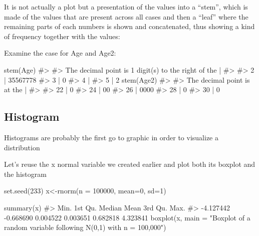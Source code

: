 \documentclass[
  letterpaper,
  DIV=11,
  numbers=noendperiod]{scrreprt}
\newenvironment{Shaded}{\begin{snugshade}}{\end{snugshade}}
\newcommand{\AttributeTok}[1]{\textcolor[rgb]{0.40,0.45,0.13}{#1}}
\newcommand{\CommentTok}[1]{\textcolor[rgb]{0.37,0.37,0.37}{#1}}
\newcommand{\DecValTok}[1]{\textcolor[rgb]{0.68,0.00,0.00}{#1}}
\newcommand{\FunctionTok}[1]{\textcolor[rgb]{0.28,0.35,0.67}{#1}}
\newcommand{\NormalTok}[1]{\textcolor[rgb]{0.00,0.23,0.31}{#1}}
\newcommand{\OtherTok}[1]{\textcolor[rgb]{0.00,0.23,0.31}{#1}}
\newcommand{\StringTok}[1]{\textcolor[rgb]{0.13,0.47,0.30}{#1}}
\begin{document}
It is not actually a plot but a presentation of the values into a
``stem'', which is made of the values that are present across all cases
and then a ``leaf'' where the remaining parts of each numbers is shown
and concatenated, thus showing a kind of frequency together with the
values:

Examine the case for Age and Age2:

\begin{Shaded}
\begin{Highlighting}[]
\FunctionTok{stem}\NormalTok{(Age)}
\CommentTok{\#\textgreater{} }
\CommentTok{\#\textgreater{}   The decimal point is 1 digit(s) to the right of the |}
\CommentTok{\#\textgreater{} }
\CommentTok{\#\textgreater{}   2 | 35567778}
\CommentTok{\#\textgreater{}   3 | 0}
\CommentTok{\#\textgreater{}   4 | }
\CommentTok{\#\textgreater{}   5 | 2}
\FunctionTok{stem}\NormalTok{(Age2)}
\CommentTok{\#\textgreater{} }
\CommentTok{\#\textgreater{}   The decimal point is at the |}
\CommentTok{\#\textgreater{} }
\CommentTok{\#\textgreater{}   22 | 0}
\CommentTok{\#\textgreater{}   24 | 00}
\CommentTok{\#\textgreater{}   26 | 0000}
\CommentTok{\#\textgreater{}   28 | 0}
\CommentTok{\#\textgreater{}   30 | 0}
\end{Highlighting}
\end{Shaded}

\subsection{Histogram}\label{histogram}

Histograms are probably the first go to graphic in order to visualize a
distribution

Let's reuse the x normal variable we created earlier and plot both its
boxplot and the histogram

\begin{Shaded}
\begin{Highlighting}[]
\FunctionTok{set.seed}\NormalTok{(}\DecValTok{233}\NormalTok{)}
\NormalTok{x}\OtherTok{\textless{}{-}}\FunctionTok{rnorm}\NormalTok{(}\AttributeTok{n =} \DecValTok{100000}\NormalTok{, }\AttributeTok{mean=}\DecValTok{0}\NormalTok{, }\AttributeTok{sd=}\DecValTok{1}\NormalTok{)}

\FunctionTok{summary}\NormalTok{(x)}
\CommentTok{\#\textgreater{}      Min.   1st Qu.    Median      Mean   3rd Qu.      Max. }
\CommentTok{\#\textgreater{} {-}4.127442 {-}0.668690  0.004522  0.003651  0.682818  4.323841}
\FunctionTok{boxplot}\NormalTok{(x, }\AttributeTok{main =} \StringTok{"Boxplot of a random variable following N(0,1) with n = 100,000"}\NormalTok{)}
\end{Highlighting}
\end{Shaded}
\end{document}
